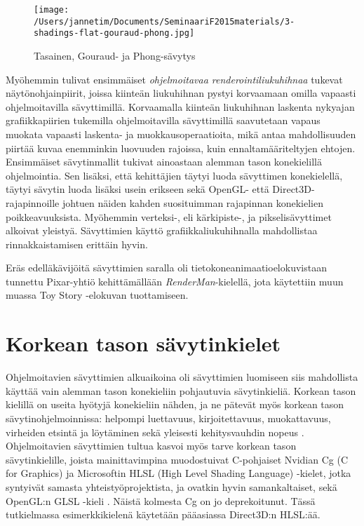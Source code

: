 \documentclass[finnish]{tktltiki2}
\theoremstyle{definition}
\theoremstyle{remark}
\begin{document}
\begin{figure}[!htbp]
\texttt{[image: /Users/jannetim/Documents/SeminaariF2015materials/3-shadings-flat-gouraud-phong.jpg]}
\caption{Tasainen, Gouraud- ja Phong-sävytys}
\label{FGP}
\end{figure}

Myöhemmin tulivat ensimmäiset \emph{ohjelmoitavaa renderointiliukuhihnaa} tukevat näytönohjainpiirit, joissa kiinteän liukuhihnan pystyi korvaamaan omilla vapaasti ohjelmoitavilla sävyttimillä. Korvaamalla kiinteän liukuhihnan laskenta nykyajan grafiikkapiirien tukemilla ohjelmoitavilla sävyttimillä saavutetaan vapaus muokata vapaasti laskenta- ja muokkausoperaatioita, mikä antaa mahdollisuuden piirtää kuvaa enemminkin luovuuden rajoissa, kuin ennaltamääriteltyjen ehtojen. Ensimmäiset sävytinmallit tukivat ainoastaan alemman tason konekielillä ohjelmointia. Sen lisäksi, että kehittäjien täytyi luoda sävyttimen konekielellä, täytyi sävytin luoda lisäksi usein erikseen sekä OpenGL- että Direct3D-rajapinnoille johtuen näiden kahden suosituimman rajapinnan konekielien poikkeavuuksista. Myöhemmin verteksi-, eli kärkipiste-, ja pikselisävyttimet alkoivat yleistyä. Sävyttimien käyttö grafiikkaliukuhihnalla mahdollistaa rinnakkaistamisen erittäin hyvin. 
\cite{Ake02}

Eräs edelläkävijöitä sävyttimien saralla oli tietokoneanimaatioelokuvistaan tunnettu Pixar-yhtiö kehittämällään \emph{RenderMan}-kielellä, jota käytettiin muun muassa Toy Story -elokuvan tuottamiseen.

\section{Korkean tason sävytinkielet}

Ohjelmoitavien sävyttimien alkuaikoina oli sävyttimien luomiseen siis mahdollista käyttää vain alemman tason konekieliin pohjautuvia sävytinkieliä. Korkean tason kielillä on useita hyötyjä konekieliin nähden, ja ne pätevät myös korkean tason sävytinohjelmoinnissa: helpompi luettavuus, kirjoitettavuus, muokattavuus, virheiden etsintä ja löytäminen sekä yleisesti kehitysvauhdin nopeus \cite{She08}. Ohjelmoitavien sävyttimien tultua kasvoi myös tarve korkean tason sävytinkielille, joista mainittavimpina muodostuivat C-pohjaiset Nvidian Cg (C for Graphics) \cite{Nvi03} ja Microsoftin HLSL (High Level Shading Language) -kielet, jotka syntyivät samasta yhteistyöprojektista, ja ovatkin hyvin samankaltaiset, sekä OpenGL:n GLSL -kieli \cite{Ope15}. Näistä kolmesta Cg on jo deprekoitunut. Tässä tutkielmassa esimerkkikielenä käytetään pääasiassa Direct3D:n HLSL:ää.
\end{document}
